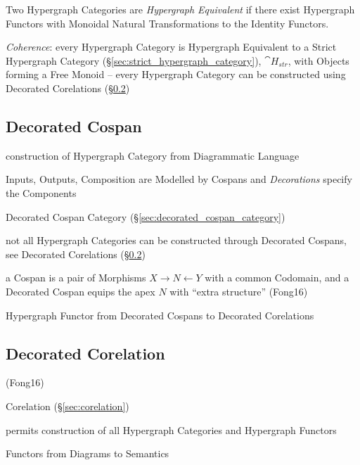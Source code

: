 Two Hypergraph Categories are \emph{Hypergraph Equivalent} if there
exist Hypergraph Functors with Monoidal Natural Transformations to the
Identity Functors.

\emph{Coherence}: every Hypergraph Category is Hypergraph Equivalent
to a Strict Hypergraph Category
(\S\ref{sec:strict_hypergraph_category}), $\cat{H}_{str}$, with
Objects forming a Free Monoid -- every Hypergraph Category can be
constructed using Decorated Corelations
(\S\ref{sec:decorated_corelation})



\subsection{Decorated Cospan}\label{sec:decorated_cospan}

construction of Hypergraph Category from Diagrammatic Language

Inputs, Outputs, Composition are Modelled by Cospans and
\emph{Decorations} specify the Components

Decorated Cospan Category (\S\ref{sec:decorated_cospan_category})

not all Hypergraph Categories can be constructed through Decorated
Cospans, see Decorated Corelations (\S\ref{sec:decorated_corelation})

a Cospan is a pair of Morphisms $X \rightarrow N \leftarrow Y$ with a
common Codomain, and a Decorated Cospan equips the apex $N$ with
``extra structure'' (Fong16) %

Hypergraph Functor from Decorated Cospans to Decorated Corelations



\subsection{Decorated Corelation}\label{sec:decorated_corelation}

(Fong16)

Corelation (\S\ref{sec:corelation})

permits construction of all Hypergraph Categories and Hypergraph
Functors

Functors from Diagrams to Semantics

